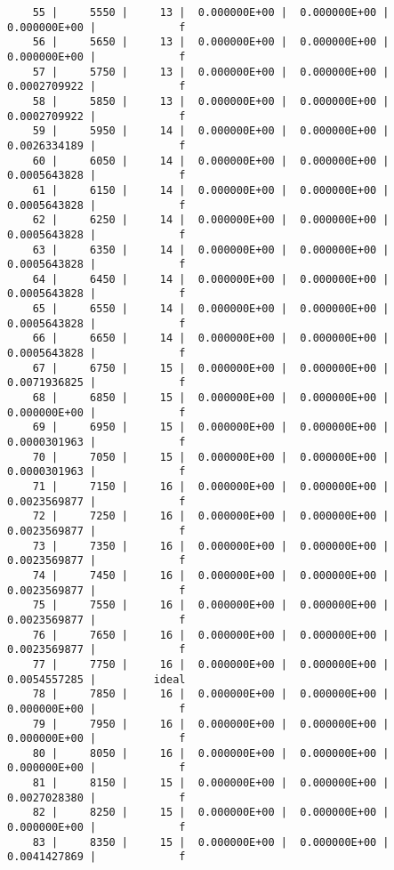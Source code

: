 \documentclass[
  letterpaper,
  DIV=11,
  numbers=noendperiod]{scrartcl}
\begin{document}
\begin{verbatim}
    55 |     5550 |     13 |  0.000000E+00 |  0.000000E+00 |  0.000000E+00 |             f
    56 |     5650 |     13 |  0.000000E+00 |  0.000000E+00 |  0.000000E+00 |             f
    57 |     5750 |     13 |  0.000000E+00 |  0.000000E+00 |  0.0002709922 |             f
    58 |     5850 |     13 |  0.000000E+00 |  0.000000E+00 |  0.0002709922 |             f
    59 |     5950 |     14 |  0.000000E+00 |  0.000000E+00 |  0.0026334189 |             f
    60 |     6050 |     14 |  0.000000E+00 |  0.000000E+00 |  0.0005643828 |             f
    61 |     6150 |     14 |  0.000000E+00 |  0.000000E+00 |  0.0005643828 |             f
    62 |     6250 |     14 |  0.000000E+00 |  0.000000E+00 |  0.0005643828 |             f
    63 |     6350 |     14 |  0.000000E+00 |  0.000000E+00 |  0.0005643828 |             f
    64 |     6450 |     14 |  0.000000E+00 |  0.000000E+00 |  0.0005643828 |             f
    65 |     6550 |     14 |  0.000000E+00 |  0.000000E+00 |  0.0005643828 |             f
    66 |     6650 |     14 |  0.000000E+00 |  0.000000E+00 |  0.0005643828 |             f
    67 |     6750 |     15 |  0.000000E+00 |  0.000000E+00 |  0.0071936825 |             f
    68 |     6850 |     15 |  0.000000E+00 |  0.000000E+00 |  0.000000E+00 |             f
    69 |     6950 |     15 |  0.000000E+00 |  0.000000E+00 |  0.0000301963 |             f
    70 |     7050 |     15 |  0.000000E+00 |  0.000000E+00 |  0.0000301963 |             f
    71 |     7150 |     16 |  0.000000E+00 |  0.000000E+00 |  0.0023569877 |             f
    72 |     7250 |     16 |  0.000000E+00 |  0.000000E+00 |  0.0023569877 |             f
    73 |     7350 |     16 |  0.000000E+00 |  0.000000E+00 |  0.0023569877 |             f
    74 |     7450 |     16 |  0.000000E+00 |  0.000000E+00 |  0.0023569877 |             f
    75 |     7550 |     16 |  0.000000E+00 |  0.000000E+00 |  0.0023569877 |             f
    76 |     7650 |     16 |  0.000000E+00 |  0.000000E+00 |  0.0023569877 |             f
    77 |     7750 |     16 |  0.000000E+00 |  0.000000E+00 |  0.0054557285 |         ideal
    78 |     7850 |     16 |  0.000000E+00 |  0.000000E+00 |  0.000000E+00 |             f
    79 |     7950 |     16 |  0.000000E+00 |  0.000000E+00 |  0.000000E+00 |             f
    80 |     8050 |     16 |  0.000000E+00 |  0.000000E+00 |  0.000000E+00 |             f
    81 |     8150 |     15 |  0.000000E+00 |  0.000000E+00 |  0.0027028380 |             f
    82 |     8250 |     15 |  0.000000E+00 |  0.000000E+00 |  0.000000E+00 |             f
    83 |     8350 |     15 |  0.000000E+00 |  0.000000E+00 |  0.0041427869 |             f

\end{verbatim}
\end{document}
